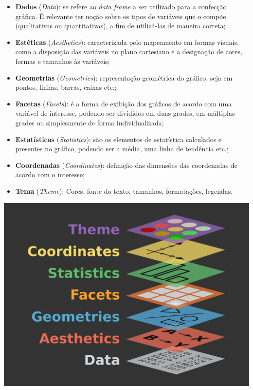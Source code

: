 \documentclass[
  brazilian,
]{book}
\let\origfigure\figure
\let\endorigfigure\endfigure
\renewenvironment{figure}[1][2] {
    \expandafter\origfigure\expandafter[H]
} {
    \endorigfigure
}
\begin{document}
\begin{itemize}
\item
  \textbf{Dados} (\emph{Data}): se refere ao \emph{data frame} a ser utilizado para a confecção gráfica. É relevante ter noção sobre os tipos de variáveis que o compõe (qualitativas ou quantitativas), a fim de utilizá-las de maneira correta;
\item
  \textbf{Estéticas} (\emph{Aesthetics}): caracterizada pelo mapeamento em formas visuais, como a disposição das variáveis no plano cartesiano e a designação de cores, formas e tamanhos às variáveis;
\item
  \textbf{Geometrias} (\emph{Geometries}): representação geométrica do gráfico, seja em pontos, linhas, barras, caixas etc.;
\item
  \textbf{Facetas} (\emph{Facets}): é a forma de exibição dos gráficos de acordo com uma variável de interesse, podendo ser divididos em duas grades, em múltiplas grades ou simplesmente de forma individualizada;
\item
  \textbf{Estatísticas} (\emph{Statistics}): são os elementos de estatística calculados e presentes no gráfico, podendo ser a média, uma linha de tendência etc.;
\item
  \textbf{Coordenadas} (\emph{Coordinates}): definição das dimensões das coordenadas de acordo com o interesse;
\item
  \textbf{Tema} (\emph{Theme}): Cores, fonte do texto, tamanhos, formatações, legendas.
\end{itemize}

\begin{figure}

{\centering \includegraphics[width=0.7\linewidth]{imagens/gglayers} 

}

\caption{Representação das 7 camadas presentes na gramática de gráficos, as quais utilizamos no ggplot2. Fonte: The Grammar of Graphics, 2005.}\label{fig:unnamed-chunk-182}
\end{figure}
\end{document}
